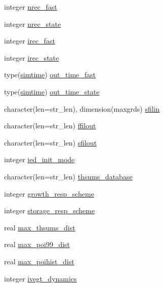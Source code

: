 \begin{DoxyCompactItemize}
\item 
integer \hyperlink{namespaceed__misc__coms_af0a95649338517093c6e6b84fb85d554}{nrec\+\_\+fast}
\item 
integer \hyperlink{namespaceed__misc__coms_a0c4b723dc3751cb2127ac65f3f46e472}{nrec\+\_\+state}
\item 
integer \hyperlink{namespaceed__misc__coms_aebcf01a69f10935f86df08aca7c5df80}{irec\+\_\+fast}
\item 
integer \hyperlink{namespaceed__misc__coms_ae918e21c6b7922bf0aa710e426b9afda}{irec\+\_\+state}
\item 
type(\hyperlink{structed__misc__coms_1_1simtime}{simtime}) \hyperlink{namespaceed__misc__coms_a245a1864e1393cbcc92a46204879ecd2}{out\+\_\+time\+\_\+fast}
\item 
type(\hyperlink{structed__misc__coms_1_1simtime}{simtime}) \hyperlink{namespaceed__misc__coms_a059beda609f2c3781308158d625e4207}{out\+\_\+time\+\_\+state}
\item 
character(len=str\+\_\+len), dimension(maxgrds) \hyperlink{namespaceed__misc__coms_af344c2e548c776e4b89658593bd13c30}{sfilin}
\item 
character(len=str\+\_\+len) \hyperlink{namespaceed__misc__coms_ac69f1e0ad2683b268d73b442b9d4701e}{ffilout}
\item 
character(len=str\+\_\+len) \hyperlink{namespaceed__misc__coms_a91ddea30ce69d87c8c41200312f5cf89}{sfilout}
\item 
integer \hyperlink{namespaceed__misc__coms_a3fe966618b90f36dbd7502084aa70ea4}{ied\+\_\+init\+\_\+mode}
\item 
character(len=str\+\_\+len) \hyperlink{namespaceed__misc__coms_a2c12061ad27449088c196919983f9223}{thsums\+\_\+database}
\item 
integer \hyperlink{namespaceed__misc__coms_a2f9e6633548e93a1f2048a735a869e64}{growth\+\_\+resp\+\_\+scheme}
\item 
integer \hyperlink{namespaceed__misc__coms_adfd6a78f48460401459b4ead628dcd5e}{storage\+\_\+resp\+\_\+scheme}
\item 
real \hyperlink{namespaceed__misc__coms_abbfd8a19f7457ca2dac25ee1b7320698}{max\+\_\+thsums\+\_\+dist}
\item 
real \hyperlink{namespaceed__misc__coms_abc96ae7c134acec3af4ad1d3f5fb0c93}{max\+\_\+poi99\+\_\+dist}
\item 
real \hyperlink{namespaceed__misc__coms_a901f08dcd64adce4205961137790e4ce}{max\+\_\+poihist\+\_\+dist}
\item 
integer \hyperlink{namespaceed__misc__coms_a21dc5569efa9865127c3085e8560e46d}{ivegt\+\_\+dynamics}

\end{DoxyCompactItemize}
